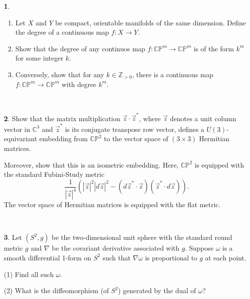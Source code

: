 \documentclass[12pt,a4paper]{amsart}
\theoremstyle{definition}
\newtheorem{problem}{}
\begin{document}
\begin{problem}\
    \begin{enumerate}
        \item Let $X$ and $Y$ be compact, orientable manifolds of the same dimension. Define the degree of a continuous map $f: X \to Y$.

        \item Show that the degree of any continuos map $f: \mathbb{CP}^m \to \mathbb{CP}^m$ is of the form $k^m$ for some integer $k$.

        \item Conversely, show that for any $k \in \mathbb{Z}_{>0}$, there is a continuous map $f: \mathbb{CP}^m \to \mathbb{CP}^m$ with degree $k^m$.
    \end{enumerate}
\end{problem}

\

\begin{problem}
Show that the matrix multiplication $\vec{z} \cdot \vec{z}^*$, where
$\vec{z}$ denotes a unit column vector in $\mathbb{C}^3$ and
$\vec{z}^*$ is its conjugate transpose row vector, defines a
$U(3)$-equivariant embedding from $\mathbb{C}\mathbb{P}^2$ to the
vector space of $(3\times 3)$ Hermitian matrices.

                Moreover, show that this is an isometric embedding.  Here,
                $\mathbb{C}\mathbb{P}^2$ is equipped with the standard Fubini-Study metric
                $$ \frac{1}{|\vec{z}|^4}\left( |\vec{z}|^2 |d\vec{z}|^2 - (d\vec{z}^* \cdot \vec{z}) (\vec{z}^* \cdot d\vec{z})\right).$$
                The vector space of  Hermitian matrices is equipped with the flat metric.
\end{problem}

\

\begin{problem}
Let $(S^2, g)$ be the two-dimensional unit sphere with the standard
round metric $g$ and $\nabla$ be the covariant derivative associated
with $g$. Suppose $\omega$ is a smooth differential 1-form on $S^2$
such that $\nabla \omega$ is proportional to $g$ at each point.

(1) Find all such $\omega$.

(2) What is the diffeomorphism (of $S^2$) generated by the dual of
$\omega$?
\end{problem}
\end{document}
